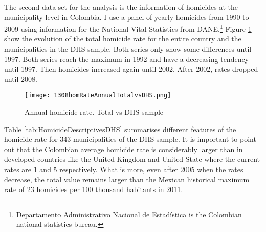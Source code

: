 \documentclass[a4paper,10pt,twocolumn,preprint,3p,authoryear]{elsarticle}
\begin{document}
The second data set for the analysis is the information of homicides at the municipality level in Colombia. I use a panel of yearly homicides from 1990 to 2009 using information for the National Vital Statistics from DANE.\footnote{Departamento Administrativo Nacional de Estad\'istica is the Colombian national statistics bureau.}  Figure \ref{fig:AnnualHomicideRateTotalvsDHS} show the evolution of the total homicide rate for the entire country and the municipalities in the DHS sample. Both series only show some differences until 1997. Both series reach the maximum in 1992 and have a decreasing tendency until 1997. Then homicides increased again until 2002. After 2002, rates dropped  until 2008. 

\begin{figure}[h]
  \centering
	\texttt{[image: 1308homRateAnnualTotalvsDHS.png]}
  \caption{Annual homicide rate. Total vs DHS sample}
  \label{fig:AnnualHomicideRateTotalvsDHS}
  \end{figure}

Table \ref{tab:HomicideDescriptivesDHS} summarises different features of the homicide rate for  343 municipalities of the DHS sample.  It is important to point out that the  Colombian average homicide rate is considerably larger than in developed countries like the United Kingdom and United State where the current rates are 1 and 5 respectively. What is more, even after 2005 when the rates decrease, the total value remains larger than the Mexican historical maximum rate of 23 homicides per 100 thousand habitants in 2011. %
\end{document}
